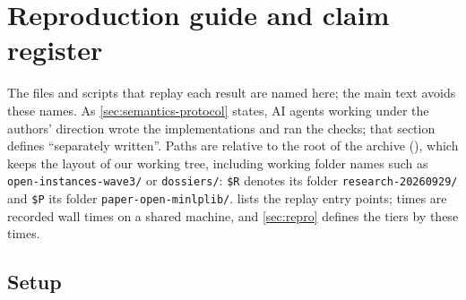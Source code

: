 \section{Reproduction guide and claim register}\label{app:repro}

The files and scripts that replay each result are named here; the main text avoids these names.
As \cref{sec:semantics-protocol} states, AI agents working under the authors' direction wrote the implementations and ran the checks; that section defines ``separately written''.
Paths are relative to the root of the archive (\archiveDOI), which keeps the layout of our working tree, including working folder names such as \nolinkurl{open-instances-wave3/} or \nolinkurl{dossiers/}: \nolinkurl{$R} denotes its folder \nolinkurl{research-20260929/} and \nolinkurl{$P} its folder \nolinkurl{paper-open-minlplib/}.
 lists the replay entry points; times are recorded wall times on a shared machine, and \cref{sec:repro} defines the tiers by these times.

\subsection{Setup}\label{app:repro-setup}

